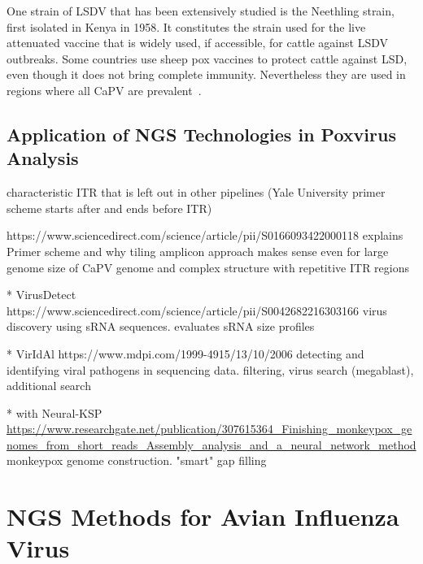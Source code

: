 One strain of LSDV that has been extensively studied is the Neethling strain, first isolated in Kenya in 1958. It constitutes the strain used for the live attenuated vaccine that is widely used, if accessible, for cattle against LSDV outbreaks. Some countries use sheep pox vaccines to protect cattle against LSD, even though it does not bring complete immunity. Nevertheless they are used in regions where all CaPV are prevalent~\cite{brenner2009appearance}.

\subsection{Application of NGS Technologies in Poxvirus Analysis}
characteristic ITR that is left out in other pipelines (Yale University primer scheme starts after and ends before ITR)

https://www.sciencedirect.com/science/article/pii/S0166093422000118 explains Primer scheme and why tiling amplicon approach makes sense even for large genome size of CaPV genome and complex structure with repetitive ITR regions

* VirusDetect https://www.sciencedirect.com/science/article/pii/S0042682216303166
virus discovery using sRNA sequences. evaluates sRNA size profiles

* VirIdAl https://www.mdpi.com/1999-4915/13/10/2006
detecting and identifying viral pathogens in sequencing data. filtering, virus search (megablast), additional search

* with Neural-KSP \url{https://www.researchgate.net/publication/307615364_Finishing_monkeypox_genomes_from_short_reads_Assembly_analysis_and_a_neural_network_method}
monkeypox genome construction. "smart" gap filling


\section{NGS Methods for Avian Influenza Virus}\label{sec:AIV}
